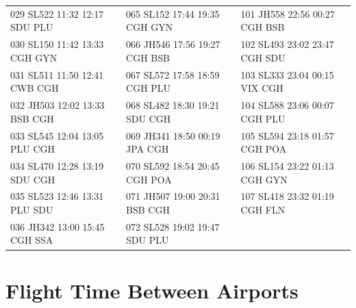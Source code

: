 \documentclass{endm}
\begin{document}
\begin{center}
\begin{longtable}{lll}
\scriptsize  029 SL522 11:32 12:17 SDU PLU   & \scriptsize 065 SL152 17:44 19:35 CGH GYN   &   \scriptsize 101 JH558 22:56 00:27 CGH BSB\\
\scriptsize  030 SL150 11:42 13:33 CGH GYN  & \scriptsize066 JH546 17:56 19:27 CGH BSB   &   \scriptsize   102 SL493 23:02 23:47 CGH SDU\\
\scriptsize  031 SL511 11:50 12:41 CWB CGH  & \scriptsize067 SL572 17:58 18:59 CGH PLU  &   \scriptsize  103 SL333 23:04 00:15 VIX CGH\\
\scriptsize  032 JH503 12:02 13:33 BSB CGH    & \scriptsize068 SL482 18:30 19:21 SDU CGH &  \scriptsize  104 SL588 23:06 00:07 CGH PLU\\
\scriptsize  033 SL545 12:04 13:05 PLU CGH   & \scriptsize069 JH341 18:50 00:19 JPA CGH  &   \scriptsize   105 SL594 23:18 01:57 CGH POA\\
\scriptsize  034 SL470 12:28 13:19 SDU CGH  & \scriptsize070 SL592 18:54 20:45 CGH POA  &  \scriptsize   106 SL154 23:22 01:13 CGH GYN \\
\scriptsize  035 SL523 12:46 13:31 PLU SDU   & \scriptsize071 JH507 19:00 20:31 BSB CGH  &   \scriptsize   107 SL418 23:32 01:19 CGH FLN\\
\scriptsize  036 JH342 13:00 15:45 CGH SSA & \scriptsize 072 SL528 19:02 19:47 SDU PLU & \\

\end{longtable}

\end{center}

\newpage
\section{Flight Time Between Airports}
\end{document}
